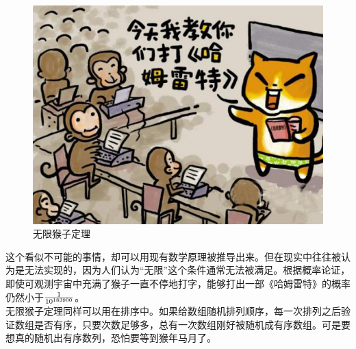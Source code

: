 \begin{figure}[H]
	\centering
	\includegraphics[]{img/Chapter8/8-12/1.png}
	\caption{无限猴子定理}
\end{figure}

这个看似不可能的事情，却可以用现有数学原理被推导出来。但在现实中往往被认为是无法实现的，因为人们认为“无限”这个条件通常无法被满足。根据概率论证，即使可观测宇宙中充满了猴子一直不停地打字，能够打出一部《哈姆雷特》的概率仍然小于$ 1 \over 10^{183900} $。\\

无限猴子定理同样可以用在排序中。如果给数组随机排列顺序，每一次排列之后验证数组是否有序，只要次数足够多，总有一次数组刚好被随机成有序数组。可是要想真的随机出有序数列，恐怕要等到猴年马月了。

\newpage